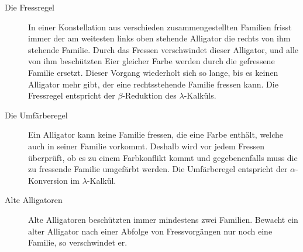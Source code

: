 \begin{description}

		\item[Die Fressregel] In einer Konstellation aus verschieden zusammengestellten Familien frisst immer der am weitesten links oben stehende Alligator die rechts von ihm stehende Familie.
		Durch das Fressen verschwindet dieser Alligator, und alle von ihm beschützten Eier gleicher Farbe werden durch die gefressene Familie ersetzt.
		Dieser Vorgang wiederholt sich so lange, bis es keinen Alligator mehr gibt, der eine rechtsstehende Familie fressen kann.
		Die Fressregel entspricht der \(\beta\)-Reduktion des \(\lambda\)-Kalküls.

		\item[Die Umfärberegel] Ein Alligator kann keine Familie fressen, die eine Farbe enthält, welche auch in seiner Familie vorkommt.
		Deshalb wird vor jedem Fressen überprüft, ob es zu einem Farbkonflikt kommt und gegebenenfalls muss die zu fressende Familie umgefärbt werden.
		Die Umfärberegel entspricht der \(\alpha\)-Konversion im \(\lambda\)-Kalkül.

		\item[Alte Alligatoren] Alte Alligatoren beschützten immer mindestens zwei Familien.
		Bewacht ein alter Alligator nach einer Abfolge von Fressvorgängen nur noch eine Familie, so verschwindet er.

	\end{description}
